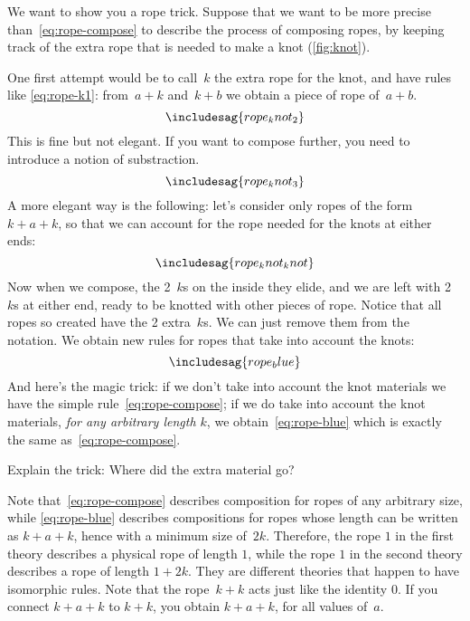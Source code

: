 We want to show you a rope trick.
Suppose that we want to be more precise than~\cref{eq:rope-compose} to describe the process of composing ropes, by keeping track of the extra rope that is needed to make a knot (\cref{fig:knot}).


One first attempt would be to call~$k$ the extra rope for the knot, and have rules like \cref{eq:rope-k1}: from~$a + k$ and~$k + b$ we obtain a piece of rope of~$a+b$.
%
\begin{equation}\label{eq:rope-k1}
\includesag{rope_knot_2}
\end{equation}
%
This is fine but not elegant.
If you want to compose further, you need to introduce a notion of substraction.
%
\begin{equation}\label{eq:rope-k2}
\includesag{rope_knot_3}
\end{equation}
%
A more elegant way is the following: let's consider only ropes of the form~$k + a + k$, so that we can account for the rope needed for the knots at either ends:
%
\begin{equation}\label{eq:rope-kk}
\includesag{rope_knot_knot}
\end{equation}
%
Now when we compose, the 2~$k$s on the inside they elide, and we are left with 2~$k$s at either end, ready to be knotted with other pieces of rope.
Notice that all ropes so created have the 2 extra~$k$s.
We can just remove them from the notation. We obtain new rules for ropes that take into account the knots:
%
\begin{equation*}\label{eq:rope-blue}
\includesag{rope_blue}
  \end{equation*}
%
And here's the magic trick: if we don't take into account the knot materials we have the simple rule~\cref{eq:rope-compose}; if we do take into account the knot materials, \emph{for any arbitrary length $k$}, we obtain~\cref{eq:rope-blue} which is exactly the same as~\cref{eq:rope-compose}.

\begin{exercise}
  Explain the trick: Where did the extra material go?
\end{exercise}
\begin{solution}
  Note that~\cref{eq:rope-compose} describes composition for ropes of any arbitrary size, while \cref{eq:rope-blue} describes compositions for ropes whose length can be written as $k+a+k$, hence with a minimum size of~$2k$. Therefore, the rope $1$ in the first theory describes a physical rope of length $1$, while the rope $1$ in the second theory describes a rope of length $1+2k$. They are different theories that happen to have isomorphic rules.
  Note that the rope~$k+k$ acts just like the identity 0. If you connect $k + a + k$ to $k+k$, you obtain $k + a + k$, for all values of~$a$.
\end{solution}

